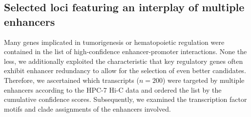 \subsection{Selected loci featuring an interplay of multiple enhancers}
\label{chap:r:enhancers:targets:genes:combined}

Many genes implicated in tumorigenesis or hematopoietic regulation were contained in the list of high-confidence enhancer-promoter interactions. None the less, we additionally exploited the characteristic that  key regulatory genes often exhibit enhancer redundancy\cite{Osterwalder2018} to allow for the selection of even better candidates. Therefore, we ascertained which transcripts ($n\!=\!200$) were targeted by multiple enhancers according to the HPC-7 Hi-C data and ordered the list by the cumulative confidence scores. Subsequently, we examined the transcription factor motifs and clade assignments of the enhancers involved. 

